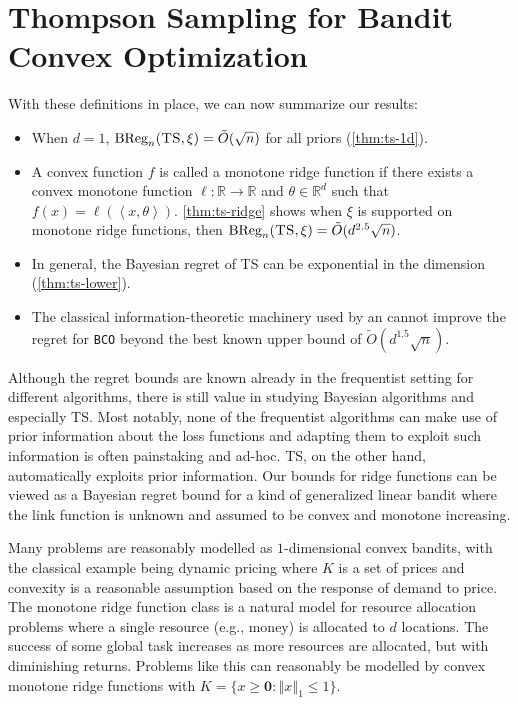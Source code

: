 \documentclass[letter, 12pt]{report}
\newcommand{\R}{\mathbb R}
\newcommand{\ip}[1]{\left \langle #1 \right \rangle}
\newcommand{\BReg}{\textrm{BReg}}
\newcommand{\norm}[1]{\left \Vert  #1 \right \Vert}
\newcommand{\zeros}{ \bm 0}
\newcommand{\1}{\mathbf{1}}
\newcommand{\bco}{\texttt{BCO}\xspace}
\newcommand{\ts}{\textsc{TS}\xspace}
\theoremstyle{plain}
\theoremstyle{definition}
\theoremstyle{remark}
\begin{document}
\section{Thompson Sampling for Bandit Convex Optimization}
With these definitions in place, we can now summarize our results:
\begin{itemize}
    \item When $d = 1$, $\BReg_n(\ts, \xi) = \tilde O(\sqrt{n})$ for all priors (\cref{thm:ts-1d}).

    \item A convex function $f$ is called a monotone ridge function if there exists a convex monotone function $\ell : \R \to \R$ and $\theta \in \R^d$ such that
          $f(x) = \ell(\ip{x, \theta})$.
          \cref{thm:ts-ridge} shows when $\xi$ is supported on monotone ridge functions, then $\BReg_n(\ts, \xi) = \tilde O(d^{2.5} \sqrt{n})$.

    \item In general, the Bayesian regret of \ts{} can be exponential in the dimension (\cref{thm:ts-lower}).

    \item The classical information-theoretic machinery used by \cite{BE18} an \cite{Lat20-cvx} cannot improve
          the regret for \bco beyond the best known upper bound of $\tilde O(d^{1.5} \sqrt{n})$.
\end{itemize}
Although the regret bounds are known already in the frequentist setting for different algorithms, there is still value in studying Bayesian algorithms
and especially \ts.
Most notably, none of the frequentist algorithms can make use of prior information about the loss functions and adapting them to exploit such information
is often painstaking and ad-hoc.
\ts, on the other hand, automatically exploits prior information.
Our bounds for ridge functions can be viewed as a Bayesian regret bound for a kind of generalized linear bandit where
the link function is unknown and assumed to be convex and monotone
increasing.

Many problems are reasonably modelled as $1$-dimensional convex bandits, with the classical example being dynamic pricing
where $K$ is a set of prices and convexity is a reasonable assumption based on the response of demand to price.
The monotone ridge function class is a natural model for resource allocation problems where a single resource (e.g., money) is allocated to $d$ locations.
The success of some global task increases as more resources are allocated, but with diminishing returns. Problems like this can reasonably be modelled
by convex monotone ridge functions with $K = \{x \geq \zeros : \norm{x}_1 \leq 1\}$.
\end{document}

